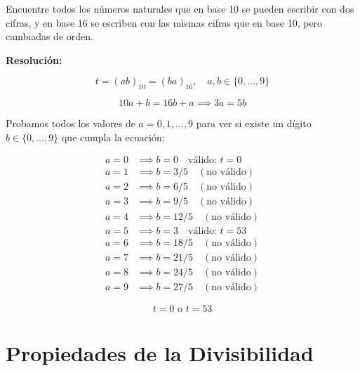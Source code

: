 \documentclass[a4paper,12pt]{article}
\begin{document}
\begin{ejercicio}[title=Ejercicio 4]
Encuentre todos los números naturales que en base 10 se pueden escribir con dos cifras, y en base 16 se escriben con las mismas cifras que en base 10, pero cambiadas de orden.

\tcblower
\textbf{Resolución:}

\[
t = (ab)_{10} = (ba)_{16}, \quad a,b \in \{0,\dots,9\}
\]

\[
10a + b = 16b + a \implies 3a = 5b
\]

Probamos todos los valores de \(a = 0,1,\dots,9\) para ver si existe un dígito \(b \in \{0,\dots,9\}\) que cumpla la ecuación:

\[
\begin{aligned}
a = 0 &\implies b = 0 \quad \text{válido: } t = 0 \\
a = 1 &\implies b = 3/5 \quad (\text{no válido}) \\
a = 2 &\implies b = 6/5 \quad (\text{no válido}) \\
a = 3 &\implies b = 9/5 \quad (\text{no válido}) \\
a = 4 &\implies b = 12/5 \quad (\text{no válido}) \\
a = 5 &\implies b = 3 \quad \text{válido: } t = 53 \\
a = 6 &\implies b = 18/5 \quad (\text{no válido}) \\
a = 7 &\implies b = 21/5 \quad (\text{no válido}) \\
a = 8 &\implies b = 24/5 \quad (\text{no válido}) \\
a = 9 &\implies b = 27/5 \quad (\text{no válido})
\end{aligned}
\]

\[
\boxed{t = 0 \text{ o } t = 53}
\]

\end{ejercicio}

\section{Propiedades de la Divisibilidad}
\end{document}
